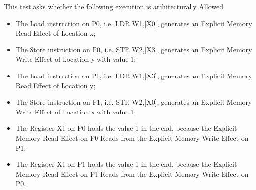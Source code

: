 This test asks whether the following execution is architecturally Allowed:

\begin{itemize}
  \item The Load instruction on P0, i.e. LDR W1,[X0], generates an Explicit Memory Read Effect of Location x;
  \item The Store instruction on P0, i.e. STR W2,[X3], generates an Explicit Memory Write Effect of Location y with value 1;
  \item The Load instruction on P1, i.e. LDR W1,[X3], generates an Explicit Memory Read Effect of Location y;
  \item The Store instruction on P1, i.e. STR W2,[X0], generates an Explicit Memory Write Effect of Location x with value 1;
  \item The Register X1 on P0 holds the value 1 in the end, because the Explicit Memory Read Effect on P0 Reads-from the Explicit Memory Write Effect on P1;
  \item The Register X1 on P1 holds the value 1 in the end, because the Explicit Memory Read Effect on P1 Reads-from the Explicit Memory Write Effect on P0.
\end{itemize}
